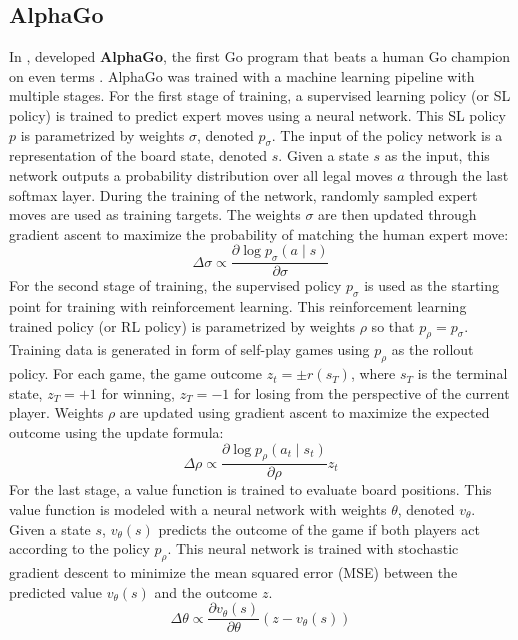 \subsection{AlphaGo}
In \citeyear{MasteringGameGo_Silver.Schrittwieser.ea_2017},
\citeauthor{MasteringGameGo_Silver.Schrittwieser.ea_2017} developed \textbf{AlphaGo},
the first Go program that beats a human Go champion on even terms \cite{MasteringGameGo_Silver.Schrittwieser.ea_2017}.
AlphaGo was trained with a machine learning pipeline with multiple stages.
For the first stage of training, a supervised learning policy (or SL policy) is trained to predict expert moves using a neural network.
This SL policy $p$ is parametrized by weights $\sigma$, denoted $p_{\sigma}$.
The input of the policy network is a representation of the board state, denoted $s$.
Given a state $s$ as the input, this network outputs a probability distribution over all legal moves $a$ through the last softmax layer.
During the training of the network, randomly sampled expert moves are used as training targets.
The weights $\sigma$ are then updated through gradient ascent to maximize the probability of matching the human expert move:
$$
    \Delta \sigma \propto \frac{\partial \log p_{\sigma}(a \mid s)}{\partial \sigma}
$$
For the second stage of training, the supervised policy $p_{\sigma}$ is used as the starting point for training with reinforcement learning.
This reinforcement learning trained policy (or RL policy) is parametrized by weights $\rho$ so that $p_{\rho} = p_{\sigma}$.
Training data is generated in form of self-play games using $p_{\rho}$ as the rollout policy.
For each game, the game outcome $z_t = \pm r(s_T)$, where $s_T$ is the terminal state, $z_T = +1$ for winning, $z_T = -1$ for losing from the perspective of the current player.
Weights $\rho$ are updated using gradient ascent to maximize the expected outcome using the update formula:
$$
    \Delta \rho \propto \frac{\partial \log p_{\rho}\left(a_{t} \mid s_{t}\right)}{\partial \rho} z_{t}
$$
For the last stage, a value function is trained to evaluate board positions.
This value function is modeled with a neural network with weights $\theta$, denoted $v_{\theta}$.
Given a state $s$, $v_{\theta}(s)$ predicts the outcome of the game if both players act according to the policy $p_{\rho}$.
This neural network is trained with stochastic gradient descent to minimize the mean squared error (MSE) between the predicted value $v_{\theta}(s)$ and the outcome $z$.
$$
    \Delta \theta \propto \frac{\partial v_{\theta}(s)}{\partial \theta}\left(z-v_{\theta}(s)\right)
$$


